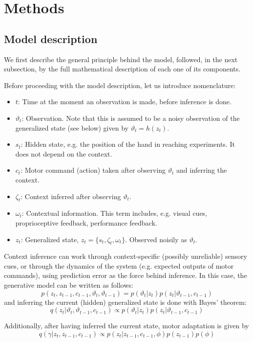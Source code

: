 \documentclass[a4paper,doc,floatsintext,natbib]{apa6}
\begin{document}
\section{Methods}
\subsection{Model description}
\label{subsection:model-description}
We first describe the general principle behind the model, followed, in the next
subsection, by the full mathematical description of each one of its components.

Before proceeding with the model description, let us introduce nomenclature:
\begin{itemize}
\item $t$: Time at the moment an observation is made, before inference is done.
\item $\vartheta_t$: Observation. Note that this is assumed to be a noisy
observation of the generalized state (see below) given by $\vartheta_t = h(z_t)$.
\item $s_t$: Hidden state, e.g. the position of the hand in reaching
experiments. It does not depend on the context.
\item $c_t$: Motor command (action) taken after observing $\vartheta_t$ and inferring the context.
\item $\zeta_t$: Context inferred after observing $\vartheta_t$.
\item $\omega_t$: Contextual information. This term includes, e.g. visual cues,
proprioceptive feedback, performance feedback.
\item $z_t$: Generalized state, $z_t = \{s_t, \zeta_t, \omega_t\}$. Observed noisily
as $\vartheta_t$.
\end{itemize}

Context inference can work through context-specific (possibly unreliable) sensory cues,
or through the dynamics of the system (e.g. expected outputs of motor
commands), using prediction error as the force behind inference. In this case,
the generative model can be written as follows:
\[
p(z_t, z_{t-1}, c_{t-1}, \vartheta_t, \vartheta_{t-1}) = p(\vartheta_t | z_t)p(z_t|\vartheta_{t-1}, c_{t-1})
\]
and inferring the current (hidden) generalized state is done with Bayes' theorem:
\[
  q(z_t | \vartheta_t, \vartheta_{t-1}, c_{t-1}) \propto p(\vartheta_t | z_t)p(z_t|\vartheta_{t-1}, c_{t-1})
\]
  
Additionally, after having inferred the current state, motor adaptation is given by
\[
q(\gamma | z_t, z_{t-1}, c_{t-1}) \propto p(z_t | z_{t-1}, c_{t-1}, \phi)p(z_{t-1})p(\phi)
\]
\end{document}
